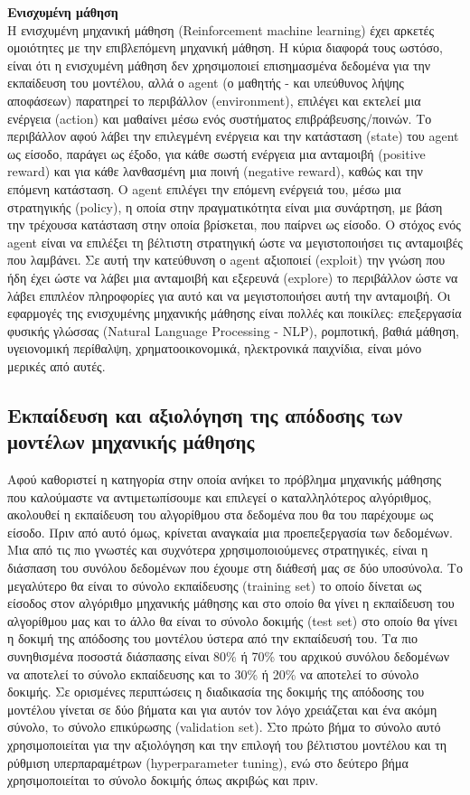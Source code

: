\noindent\textbf{Ενισχυμένη μάθηση}\\
Η ενισχυμένη μηχανική μάθηση (Reinforcement machine learning) \cite{kaelblingReinforcementLearningSurvey1996} έχει αρκετές ομοιότητες με την επιβλεπόμενη μηχανική μάθηση. Η κύρια διαφορά τους ωστόσο, είναι ότι η ενισχυμένη μάθηση δεν χρησιμοποιεί επισημασμένα δεδομένα για την εκπαίδευση του μοντέλου, αλλά ο agent (ο μαθητής -  και υπεύθυνος λήψης αποφάσεων) παρατηρεί το περιβάλλον (environment), επιλέγει και εκτελεί μια ενέργεια (action) και μαθαίνει μέσω ενός συστήματος επιβράβευσης/ποινών. Το περιβάλλον αφού λάβει την επιλεγμένη ενέργεια και την κατάσταση (state) του agent ως είσοδο, παράγει ως έξοδο, για κάθε σωστή ενέργεια μια ανταμοιβή (positive reward) και για κάθε λανθασμένη μια ποινή (negative reward), καθώς και την επόμενη κατάσταση. Ο agent επιλέγει την επόμενη ενέργειά του, μέσω μια στρατηγικής (policy), η οποία στην πραγματικότητα είναι μια συνάρτηση, με βάση την τρέχουσα κατάσταση στην οποία βρίσκεται, που παίρνει ως είσοδο. Ο στόχος ενός agent είναι να επιλέξει τη βέλτιστη στρατηγική ώστε να μεγιστοποιήσει τις ανταμοιβές που λαμβάνει. Σε αυτή την κατεύθυνση ο agent αξιοποιεί (exploit) την γνώση που ήδη έχει ώστε να λάβει μια ανταμοιβή και εξερευνά (explore) το περιβάλλον ώστε να λάβει επιπλέον πληροφορίες για αυτό και να μεγιστοποιήσει αυτή την ανταμοιβή. Οι εφαρμογές της ενισχυμένης μηχανικής μάθησης είναι πολλές και ποικίλες:  επεξεργασία φυσικής γλώσσας (Natural Language Processing - NLP), ρομποτική, βαθιά μάθηση,  υγειονομική περίθαλψη, χρηματοοικονομικά, ηλεκτρονικά παιχνίδια, είναι μόνο μερικές από αυτές.

\subsection{Εκπαίδευση και αξιολόγηση της απόδοσης των μοντέλων μηχανικής μάθησης}
\noindent Αφού καθοριστεί η κατηγορία στην οποία ανήκει το πρόβλημα μηχανικής μάθησης που καλούμαστε να αντιμετωπίσουμε και επιλεγεί ο καταλληλότερος αλγόριθμος, ακολουθεί η εκπαίδευση του αλγορίθμου στα δεδομένα που θα του παρέχουμε ως είσοδο. Πριν από αυτό όμως, κρίνεται αναγκαία μια προεπεξεργασία των δεδομένων. Μια από τις πιο γνωστές και συχνότερα χρησιμοποιούμενες στρατηγικές, είναι η διάσπαση του συνόλου δεδομένων που έχουμε στη διάθεσή μας σε δύο υποσύνολα. Το μεγαλύτερο θα είναι το σύνολο εκπαίδευσης (training set) το οποίο δίνεται ως είσοδος στον αλγόριθμο μηχανικής μάθησης και στο οποίο θα γίνει η εκπαίδευση του αλγορίθμου μας και το άλλο θα είναι το σύνολο δοκιμής (test set) στο οποίο θα γίνει η δοκιμή της απόδοσης του μοντέλου ύστερα από την εκπαίδευσή του. Τα πιο συνηθισμένα ποσοστά διάσπασης είναι 80\% ή 70\% του αρχικού συνόλου δεδομένων να αποτελεί το σύνολο εκπαίδευσης και το 30\% ή 20\% να αποτελεί το σύνολο δοκιμής. Σε ορισμένες περιπτώσεις η διαδικασία της δοκιμής της απόδοσης του μοντέλου γίνεται σε δύο βήματα και για αυτόν τον λόγο χρειάζεται και ένα ακόμη σύνολο, τo σύνολο επικύρωσης (validation set). Στο πρώτο βήμα το σύνολο αυτό χρησιμοποιείται για την αξιολόγηση και την επιλογή του βέλτιστου μοντέλου και τη ρύθμιση υπερπαραμέτρων (hyperparameter tuning), ενώ στο δεύτερο βήμα χρησιμοποιείται το σύνολο δοκιμής όπως ακριβώς και πριν. 

